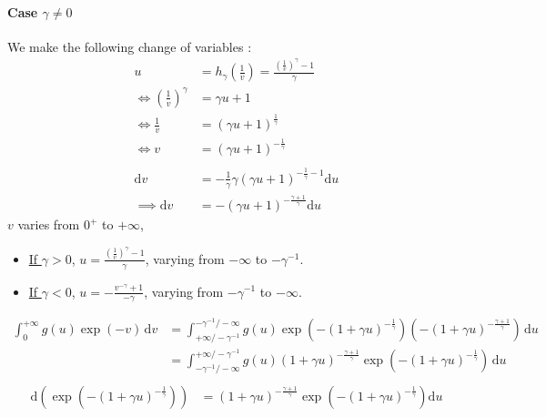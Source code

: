 \paragraph{Case $\gamma \ne 0$} We make the following change of variables :
\begin{equation}
\begin{alignat*}{2}
u &= h_\gamma(\frac{1}{v}) = \frac{(\frac{1}{v})^\gamma - 1}{\gamma}\\
\iff (\frac{1}{v})^\gamma &= \gamma u + 1\\
\iff \frac{1}{v} &= (\gamma u + 1)^{\frac{1}{\gamma}} \\
\iff v &= (\gamma u + 1)^{- \frac{1}{\gamma}} \\ \\
\mathrm{d}v &= - \frac{1}{\gamma} \gamma (\gamma u + 1)^{- \frac{1}{\gamma} - 1} \mathrm{d}u \\
\implies \mathrm{d}v &= - (\gamma u + 1)^{- \frac{\gamma + 1}{\gamma}} \mathrm{d}u
\end{alignat*}
\end{equation} $v$ varies from $0^+$ to $+ \infty$,
\begin{itemize}
	\item \underline{If $\gamma > 0$}, $u = \frac{(\frac{1}{v})^\gamma - 1}{\gamma}$, varying from $- \infty$ to $- \gamma^{-1}$.
	\item \underline{If $\gamma < 0$}, $u = - \frac{v^{- \gamma} + 1}{- \gamma}$, varying from $- \gamma^{-1}$ to $- \infty$.
\end{itemize}
\begin{equation}
\begin{alignat*}{2}
 \int_0^{+ \infty} \! g(u) \exp(- v)\, \mathrm{d}v &=  \int_{+ \infty / - \gamma^{-1}}^{- \gamma^{-1} / - \infty} \! g(u) \exp(- (1 + \gamma u)^{- \frac{1}{\gamma}}) (- (1 + \gamma u)^{- \frac{\gamma + 1}{\gamma}})\, \mathrm{d}u \\
 &=  \int_{ - \gamma^{-1} / - \infty}^{+ \infty / - \gamma^{-1}} \! g(u) (1 + \gamma u)^{- \frac{\gamma + 1}{\gamma}} \exp(- (1 + \gamma u)^{- \frac{1}{\gamma}})  \, \mathrm{d}u \\
\end{alignat*}
\end{equation}
\begin{equation}
\begin{alignat*}{2}
\mathrm{d}(\exp(- (1 + \gamma u)^{- \frac{1}{\gamma}})) &=  (1 + \gamma u)^{- \frac{\gamma + 1}{\gamma}} \exp(- (1 + \gamma u)^{- \frac{1}{\gamma}}) \mathrm{d}u
\end{alignat*}
\end{equation}
